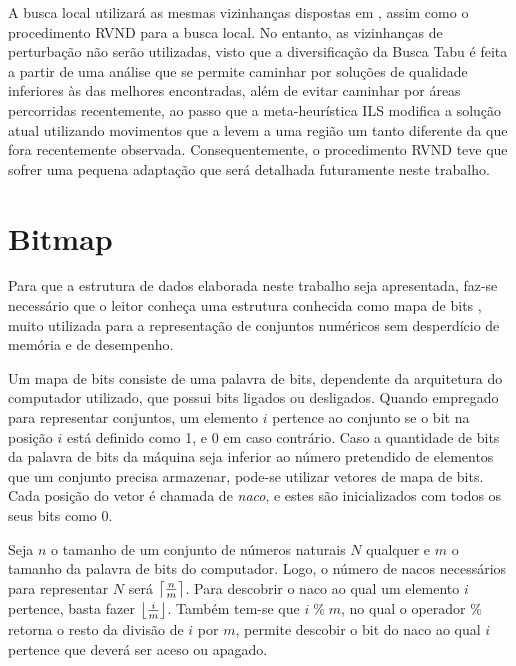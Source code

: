\par A busca local utilizará as mesmas vizinhanças dispostas em \citet{art:REF_ART_1}, assim como o procedimento RVND para a busca local. No entanto, as vizinhanças de perturbação não serão utilizadas, visto que a diversificação da Busca Tabu é feita a partir de uma análise que se permite caminhar por soluções de qualidade inferiores às das melhores encontradas, além de evitar caminhar por áreas percorridas recentemente, ao passo que a meta-heurística ILS modifica a solução atual utilizando movimentos que a levem a uma região um tanto diferente da que fora recentemente observada. Consequentemente, o procedimento RVND teve que sofrer uma pequena adaptação que será detalhada futuramente neste trabalho.

\section{Bitmap}\label{sec:LABEL_CHP_6_SEC_B}

\par Para que a estrutura de dados elaborada neste trabalho seja apresentada, faz-se necessário que o leitor conheça uma estrutura conhecida como mapa de bits \citet{correa}, muito utilizada para a representação de conjuntos numéricos sem desperdício de memória e de desempenho. 

\par Um mapa de bits consiste de uma palavra de bits, dependente da arquitetura do computador utilizado, que possui bits ligados ou desligados. Quando empregado para representar conjuntos, um elemento $i$ pertence ao conjunto se o bit na posição $i$ está definido como 1, e 0 em caso contrário. Caso a quantidade de bits da palavra de bits da máquina seja inferior ao número pretendido de elementos que um conjunto precisa armazenar, pode-se utilizar vetores de mapa de bits. Cada posição do vetor é chamada de \textit{naco}, e estes são inicializados com todos os seus bits como $0$.

\par Seja $n$ o tamanho de um conjunto de números naturais $N$ qualquer e $m$ o tamanho da palavra de bits do computador. Logo, o número de nacos necessários para representar $N$ será $\ceil*{\frac{n}{m}}$. Para descobrir o naco ao qual um elemento $i$ pertence, basta fazer $\floor*{\frac{i}{m}}$. Também tem-se que $i \;\%\; m$, no qual o operador $\%$ retorna o resto da divisão de $i$ por $m$, permite descobir o bit do naco ao qual $i$ pertence que deverá ser aceso ou apagado.

